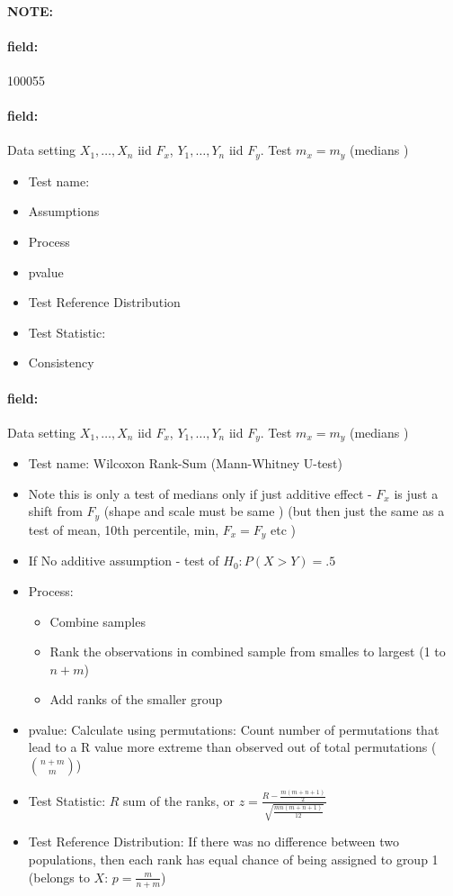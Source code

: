 \documentclass[12pt]{article}
\newenvironment{note}{\paragraph{NOTE:}}{}
\newenvironment{field}{\paragraph{field:}}{}
\begin{document}
\begin{note} \begin{field} \tiny 100055 \end{field}
 \begin{field}
  Data setting $X_1, \ldots , X_n$ iid $F_x$, $Y_1, \ldots, Y_n$ iid $F_y$. Test $m_x = m_y$ (medians )
  \begin{itemize}
   \item Test name:
   \item Assumptions
   \item Process
   \item pvalue
   \item Test Reference Distribution
   \item Test Statistic:
   \item Consistency
  \end{itemize}
 \end{field}
 \begin{field}
  Data setting $X_1, \ldots , X_n$ iid $F_x$, $Y_1, \ldots, Y_n$ iid $F_y$. Test $m_x = m_y$ (medians )
  \begin{itemize}
   \item Test name: Wilcoxon Rank-Sum (Mann-Whitney U-test)
   \item Note this is only a test of medians only if just additive effect - $F_x$ is just a shift from $F_y$ (shape and scale must be same ) (but then just the same as a test of mean, 10th percentile, min, $F_x = F_y$ etc )
   \item If No additive assumption - test of $H_0: P(X > Y) = .5$
   \item Process:
         \begin{itemize}
          \item Combine samples
          \item Rank the observations in combined sample from smalles to largest (1 to $n + m$)
          \item Add ranks of the smaller group
         \end{itemize}
   \item pvalue: Calculate using permutations: Count number of permutations that lead to a R value more extreme than observed out of total permutations ($\binom{n+m}{m}$)
   \item Test Statistic: $R$ sum of the ranks, or $z = \frac{R - \frac{m(m+n+1)}{2}}{\sqrt{\frac{mn(m+n+1)}{12}}}$
   \item Test Reference Distribution: If there was no difference between two populations, then each rank has equal chance of being assigned to group 1 (belongs to $X$: $p = \frac{m}{n+m}$)

\end{itemize}
\end{field}
\end{note}
\end{document}
